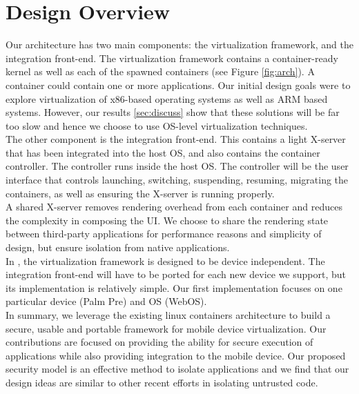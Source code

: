 \section{Design Overview}
\label{sec:overview}
Our architecture has two main components: the virtualization framework, and the integration front-end.  The virtualization framework contains a container-ready kernel as well as each of the spawned containers (see Figure \ref{fig:arch}).  A container could contain one or more applications.  Our initial design goals were to explore virtualization of x86-based operating systems as well as ARM based systems.  However, our results \ref{sec:discuss} show that these solutions will be far too slow and hence we choose to use OS-level virtualization techniques.\\

The other component is the integration front-end. This contains a light X-server that has been integrated into the host OS, and also contains the container controller. The controller runs inside the host OS. The controller will be the user interface that controls launching, switching, suspending, resuming, migrating the containers, as well as ensuring the X-server is running properly. \\

A shared X-server removes rendering overhead from each container and reduces the complexity in composing the UI. We choose to share the rendering state between third-party applications for performance reasons and simplicity of design, but ensure isolation from native applications. \\

In \emph{\proj}, the virtualization framework is designed to be device independent. The integration front-end will have to be ported for each new device we support, but its implementation is relatively simple. Our first implementation focuses on one particular device (Palm Pre) and OS (WebOS). \\

In summary, we leverage the existing linux containers architecture to build a secure, usable and portable framework for mobile device virtualization. Our contributions are focused on providing the ability for secure execution of applications while also providing integration to the mobile device. Our proposed security model is an effective method to isolate applications and we find that our design ideas are similar to other recent efforts \cite{grier2008secure} in isolating untrusted code. 
